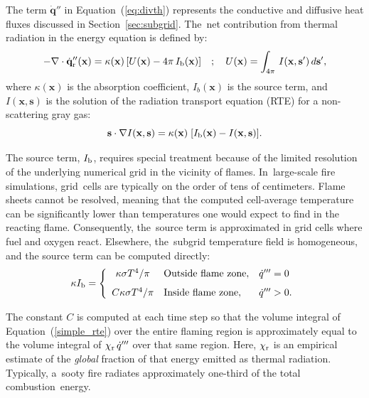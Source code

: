 \documentclass[atmosphere,article,accept,moreauthors,pdftex]{Definitions/mdpi}
\newcommand{\bx}{\mathbf{x}}
\newcommand{\bs}{\mathbf{s}}
\begin{document}
The term $\dot{\mathbf{q}}''$ in Equation~(\ref{eq:divth}) represents the conductive and diffusive heat fluxes discussed in Section~\ref{sec:subgrid}. The~net contribution from thermal radiation in the energy equation is defined by:
\begin{equation}
   -\nabla \cdot \dot{\mathbf{q}}_{\rm r}''(\bx) =
    \kappa(\bx) \, \left[ U(\bx) - 4 \pi \, I_{\rm b}(\bx) \right]  \quad ; \quad
    U(\bx) = \int_{4\pi} \, I(\bx,\bs') \, d\bs'  \label{simple_rte},
\end{equation}
where $\kappa(\bx)$ is the absorption coefficient, $I_b(\bx)$ is the source term, and~$I(\bx,\bs)$ is the solution of the radiation transport equation (RTE) for a non-scattering gray gas:
\begin{equation}
   \bs \cdot \nabla I(\bx,\bs) = \kappa(\bx) \; \left[ I_{\rm b}(\bx) - I(\bx,\bs) \right] \label{bandRTE1}.
\end{equation}

The source term, $I_{\rm b}$, requires special treatment because of the limited resolution of the underlying numerical grid in the vicinity of flames. In~large-scale fire simulations, \mbox{grid cells} are typically on the order of
tens of centimeters. Flame sheets cannot be resolved, meaning that the computed cell-average temperature can be significantly lower than temperatures one would expect to find in the reacting flame. Consequently, the~source term is approximated in grid cells where fuel and oxygen react. Elsewhere, the~subgrid temperature field is homogeneous, and the source term can be computed directly:
\begin{equation} \kappa I_{\rm b} = \left\{ \begin{array}{cll}
    \kappa \sigma T^4/\pi      & \hbox{Outside flame zone}, & \dot{q}'''=0  \\ [0.1in]
    C \kappa \sigma T^4/\pi  & \hbox{Inside flame zone}, & \dot{q}'''>0.
    \end{array} \right.  \label{radapprox1}
\end{equation}

The constant $C$ is computed at each time step so that the volume integral of \mbox{Equation~(\ref{simple_rte})} over the entire flaming region is approximately equal to the volume integral of $\chi_{\rm r} \,\dot{q}'''$ over that same region. Here, $\chi_{\rm r}$ is an empirical estimate of the {\em global} fraction of that energy emitted as thermal radiation. Typically, a~sooty fire radiates approximately one-third of the total combustion~energy.
\end{document}
